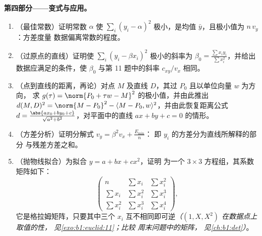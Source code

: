 \begin{problem}
\medskip
\noindent\textbf{第四部分——变式与应用。}
\begin{enumerate}[resume]
  \item （最佳常数）证明常数 $\alpha$
        使 $\sum_i (y_i - \alpha)^2$ 极小，是均值 $\bar
        y$，且极小值为 $n\,v_y$：方差度量
        数据偏离常数的程度。
  \item （过原点的直线）证明使
        $\sum_i (y_i - \beta x_i)^2$ 极小的斜率为 $\beta_0 = \frac{\sum
        x_iy_i}{\sum x_i^2}$，并给出数据应满足的条件，使
        $\beta_0$ 与第 11 题中的斜率
        $c_{xy}/v_x$ 相同。
  \item （点到直线的距离，再论）对点 $M$ 及直线
        $D$，其过 $P_0$ 且以单位向量 $w$ 为方向，
        求 $g(\tau) = \norm{P_0 + \tau w - M}^2$ 的极小值，并由此推出
        $d(M, D)^2 = \norm{M - P_0}^2 - \langle M - P_0,
        w\rangle^2$，并由此恢复距离公式 $d = \frac{\abs{a x_0 +
        b y_0 + c}}{\sqrt{a^2 + b^2}}$，对平面中的直线 $ax + by + c
        = 0$ 的情形。
  \item （方差分析）证明分解式 $v_y =
        \beta^2 v_x + \frac{E_{\min}}n$：
        即 $y_i$ 的方差分为直线所解释的部分
        与残差方差之和。
  \item （抛物线拟合）为拟合 $y = a + bx + cx^2$，证明
        为一个 $3 \times 3$ 方程组，其系数
        矩阵如下：
        \[
        \begin{pmatrix}
        n & \sum x_i & \sum x_i^2\\
        \sum x_i & \sum x_i^2 & \sum x_i^3\\
        \sum x_i^2 & \sum x_i^3 & \sum x_i^4
        \end{pmatrix},
        \]
        它是格拉姆矩阵，只要其中三个
        $x_i$ 互不相同即可逆\emph{（$(1, X, X^2)$ 在数据点上取值的性，
        见\cref{exo:b1:euclid:11}；比较
        周末问题中的矩阵，
        见\cref{ch:b1:det}）}。
\end{enumerate}


\end{problem}
